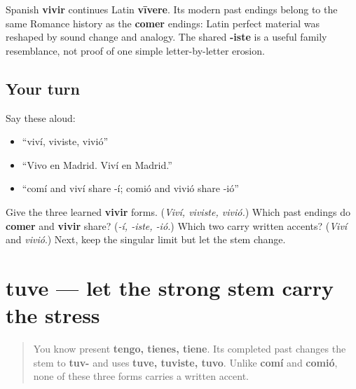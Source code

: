\begin{cousinweb}
Spanish \textbf{vivir} continues Latin \textbf{vīvere}. Its modern past endings belong to the same Romance history as the \textbf{comer} endings: Latin perfect material was reshaped by sound change and analogy. The shared \textbf{-iste} is a useful family resemblance, not proof of one simple letter-by-letter erosion.
\end{cousinweb}

\subsection*{Your turn}
Say these aloud:

\begin{itemize}
\raggedright
  \item “viví, viviste, vivió”
  \item “Vivo en Madrid. Viví en Madrid.”
  \item “comí and viví share -í; comió and vivió share -ió”
\end{itemize}

\begin{tcolorbox}[breakable,colback=teal!4,colframe=teal!35!black,title={Before you move on}]
Give the three learned \textbf{vivir} forms. (\emph{Viví, viviste, vivió.}) Which past endings do \textbf{comer} and \textbf{vivir} share? (\emph{-í, -iste, -ió.}) Which two carry written accents? (\emph{Viví} and \emph{vivió}.) Next, keep the singular limit but let the stem change.
\end{tcolorbox}
\section[tuve]{tuve — let the strong stem carry the stress}

\label{lesson:ES-C15-tener-preterite}



\begin{quote}
You know present \textbf{tengo, tienes, tiene}. Its completed past changes the stem to \textbf{tuv-} and uses \textbf{tuve, tuviste, tuvo}. Unlike \textbf{comí} and \textbf{comió}, none of these three forms carries a written accent.
\end{quote}

